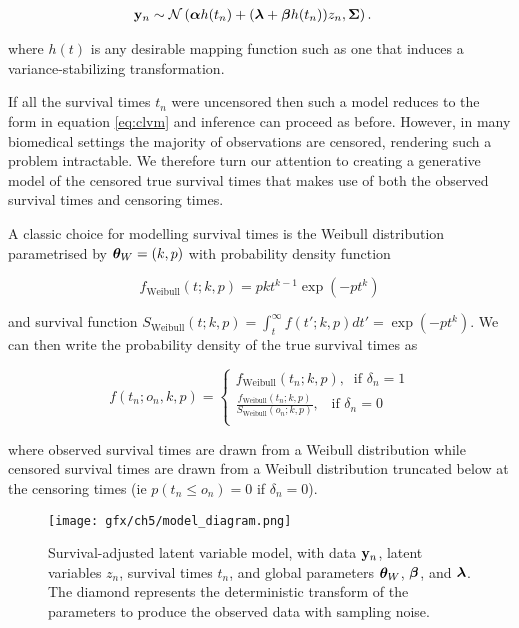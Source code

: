 \begin{equation}
  \begin{aligned}
\mathbf{y}_n & \sim \mathcal{N}\left( \bm{\alpha} h(t_n) + (\bm{\lambda} + \bm{\beta} h(t_n)) z_n, \bm{\Sigma} \right).
  \end{aligned}
\end{equation}

where $h(t)$ is any desirable mapping function such as one that induces a variance-stabilizing transformation.

If all the survival times $t_n$ were uncensored then such a model reduces to the form in equation \ref{eq:clvm} and inference can proceed as before. However, in many biomedical settings the majority of observations are censored, rendering such a problem intractable. We therefore turn our attention to creating a generative model of the censored true survival times that makes use of both the observed survival times and censoring times. %

A classic choice for modelling survival times is the Weibull distribution parametrised by $\bm{\theta}_W = (k,p)$ with probability density function

\begin{equation}
  f_{\text{Weibull}}(t; k,p) = pkt^{k-1} \exp(-pt^k)
\end{equation}

and survival function $S_{\text{Weibull}}(t; k, p) = \int_t^\infty f(t'; k, p) dt' = \exp(-pt^k)$. We can then write the probability density of the true survival times as

\begin{equation}
  f(t_n; o_n, k, p) =
  \begin{cases}
    f_{\text{Weibull}}(t_n; k, p), \; \; \text{if $\delta_n = 1$} \\
    \frac{f_{\text{Weibull}}(t_n; k, p)}{S_{\text{Weibull}}(o_n; k, p)}, \; \; \; \text{if $\delta_n = 0$} \\
  \end{cases}
\end{equation}

where observed survival times are drawn from a Weibull distribution while censored survival times are drawn from a Weibull distribution truncated below at the censoring times (ie $p(t_n \leq o_n) = 0$ if $\delta_n = 0$).

\begin{figure}
  \centering
\texttt{[image: gfx/ch5/model\_diagram.png]}
\caption{Survival-adjusted latent variable model, with data $\mathbf{y}_n$, latent variables $z_n$, survival times $t_n$, and global parameters $\bm{\theta}_W$, $\bm{\beta}$, and $\bm{\lambda}$. The diamond represents the deterministic transform of the parameters to produce the observed data with sampling noise.} \label{fig:model}
\end{figure}

